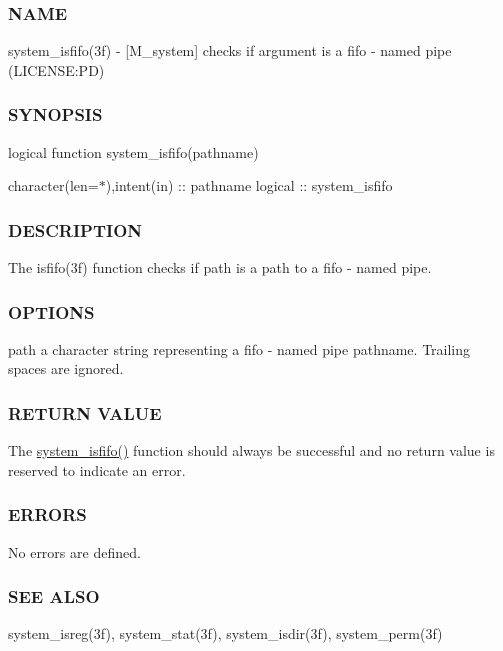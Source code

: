 \subsubsection*{N\+A\+ME}

system\+\_\+isfifo(3f) -\/ \mbox{[}M\+\_\+system\mbox{]} checks if argument is a fifo -\/ named pipe (L\+I\+C\+E\+N\+SE\+:PD) 

\subsubsection*{S\+Y\+N\+O\+P\+S\+IS}

logical function system\+\_\+isfifo(pathname)

character(len=$\ast$),intent(in) \+:\+: pathname logical \+:\+: system\+\_\+isfifo

\subsubsection*{D\+E\+S\+C\+R\+I\+P\+T\+I\+ON}

The isfifo(3f) function checks if path is a path to a fifo -\/ named pipe.

\subsubsection*{O\+P\+T\+I\+O\+NS}

path a character string representing a fifo -\/ named pipe pathname. Trailing spaces are ignored.

\subsubsection*{R\+E\+T\+U\+RN V\+A\+L\+UE}

The \mbox{\hyperlink{namespacem__system_acbcaa0c5075ca103815f441ee410e1a3}{system\+\_\+isfifo()}} function should always be successful and no return value is reserved to indicate an error.

\subsubsection*{E\+R\+R\+O\+RS}

No errors are defined.

\subsubsection*{S\+EE A\+L\+SO}

system\+\_\+isreg(3f), system\+\_\+stat(3f), system\+\_\+isdir(3f), system\+\_\+perm(3f)

